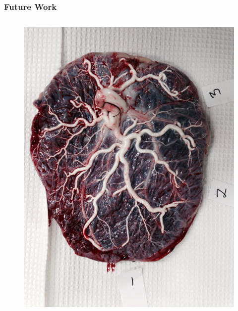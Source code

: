 \documentclass[9pt]{beamer}
\begin{document}
\begin{frame} 
	\frametitle{Future Work}
\begin{columns}[c]
\begin{column}{0.5\textwidth}
\begin{figure}
\includegraphics[height=0.45\textheight]{nb}

\end{figure}
\end{column}
\end{columns}
\end{frame}
\end{document}
